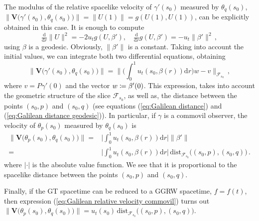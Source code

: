 \documentclass[12pt]{article}
\newcommand{\diff}{\mathrm{d}}
\newcommand{\coloneq}{\vcentcolon\mathrel{\mkern -1.2mu}\mathrel{=}}
\DeclareMathOperator{\pt}{\partial_t}
\def\f{\mathcal F}
\begin{document}
The modulus of the relative spacelike velocity of $\gamma'(s_0)$ measured by $\theta_q(s_0)$, $\big\|\textbf{V}\big(\gamma'(s_0),\theta_q(s_0)\big)\big\| = \|U(1)\| = g(U(1), U(1))$, can be explicitly obtained in this case. It is enough to compute 
\[
    \tfrac{\diff}{\diff r} \|U\|^2 = -2 u_t g(U,\beta'),\quad \tfrac{\diff}{\diff r} g(U,\beta') = -u_t \|\beta'\|^2\,,
\]
using $\beta$ is a geodesic. Obviously, $\|\beta'\|$ is a constant. Taking into account the initial values, we can integrate both two differential equations, obtaining
\begin{equation}
    \big\|\textbf{V}\big(\gamma'(s_0),\theta_q(s_0)\big)\big\| = \Big\|\Big(\int_0^1 u_t(s_0,\beta(r)) \diff r \Big) w - v \Big\|_{\f_{s_0}}\,,
\end{equation}
where $v=P^{\pt} \gamma'(0)$ and the vector $w\coloneq \beta'(0)$. This expression, takes into account the geometric structure of the slice $\f_{s_0}$, as well as, the distance between the points $(s_0,p)$ and $(s_0,q)$ (see equations (\ref{eq:Galilean distance}) and (\ref{eq:Galilean distance geodesic})). 
In particular, if $\gamma$ is a commovil observer, the velocity of $\theta_p(s_0)$ measured by $\theta_q(s_0)$ is 
\begin{equation}\label{eq:Galilean relative velocity commovil}
\begin{split}
    \big\|\textbf{V}\big(\theta_p(s_0),\theta_q(s_0)\big)\big\| ={}& \Big|\int_0^1 u_t(s_0,\beta(r)) \diff r \Big| \big\| \beta'\big\| \\
    ={}& \Big|\int_0^1 u_t(s_0,\beta(r)) \diff r \Big| \, \text{dist}_{\f_{s_0}} \big( (s_0,p), (s_0,q) \big)\,.
\end{split}
\end{equation}
where $|\cdot|$ is the absolute value function.
We see that it is proportional to the spacelike distance between the points $(s_0,p)$ and $(s_0,q)$.

Finally, if the GT spacetime can be reduced to a GGRW spacetime, $f=f(t)$, then expression (\ref{eq:Galilean relative velocity commovil}) turns out $ \|\textbf{V} \big({\theta_p(s_0)},\theta_q(s_0)\big)\| = u_t(s_0) \, \text{dist}_{\f_{s_0}} \big( (s_0,p), (s_0,q) \big)$.
\end{document}

